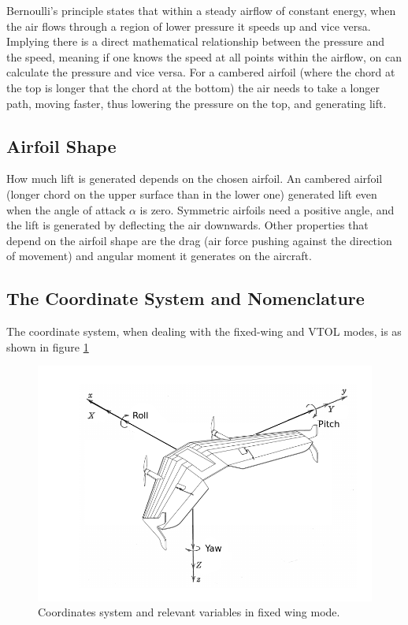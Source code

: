Bernoulli's principle states that within a steady airflow of constant energy, when the air flows through a region of lower pressure it speeds up and vice versa. Implying there is a direct mathematical relationship between the pressure and the speed, meaning if one knows the speed at all points within the airflow, on can calculate the pressure and vice versa. For a cambered airfoil (where the chord at the top is longer that the chord at the bottom) the air needs to take a longer path, moving faster, thus lowering the pressure on the top, and generating lift.


\subsection{Airfoil Shape}
How much lift is generated depends on the chosen airfoil.
%
An cambered airfoil (longer chord on the upper surface than in the lower one) generated lift even when the angle of attack $\alpha$ is zero.
Symmetric airfoils need a positive angle, and the lift is generated by deflecting the air downwards.
Other properties that depend on the airfoil shape are the drag (air force pushing against the direction of movement) and angular moment it generates on the aircraft. 

\subsection{The Coordinate System and Nomenclature}

The coordinate system, when dealing with the fixed-wing and VTOL modes, is as shown in figure \ref{fig:coords1}

\begin{figure}[h]
\centering
  \includegraphics[width=0.8\linewidth]{figs/axisfixedwing.png}
  \caption{Coordinates system and relevant variables in fixed wing mode.}
  \label{fig:coords1}
\end{figure}


